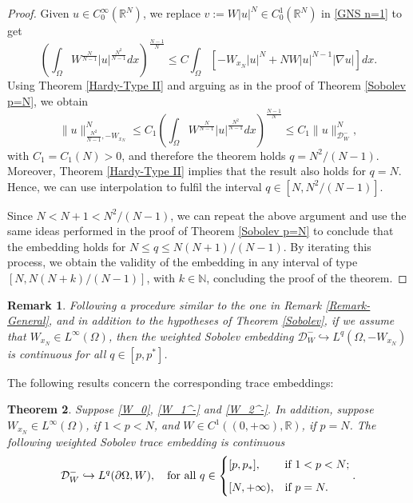 \documentclass[12pt]{amsart}
\newtheorem{theorem}{Theorem}[section]
\newtheorem{remark}[theorem]{Remark}
\theoremstyle{definition}
\theoremstyle{plain}
\newcommand{\dint}{\int_{\Omega}}
\begin{document}
\begin{proof}
    Given $u \in C^{\infty}_0(\mathbb{R}^N)$, we replace   $v:=W|u|^N \in C_0^1(\mathbb{R}^N)$ in \eqref{GNS n=1} to get 
      $$
			\left(\dint W^{\frac{N}{N-1}}|u|^{\frac{N^2}{N-1}}dx\right)^{\frac{N-1}{N}}\leq C  \dint \left[-W_{{x_N}}|u|^N+NW|u|^{N-1}|\nabla u|\right]dx.
		$$
        Using Theorem \ref{Hardy-Type II} and arguing as in the proof of Theorem \ref{Sobolev p=N}, we obtain 
		$$
			\|u\|_{\frac{N^2}{N-1},-W_{x_N}}^N \leq C_1\left(\dint  W^{\frac{N}{N-1}}|u|^{\frac{N^2}{N-1}}dx\right)^{\frac{N-1}{N}}\leq C_1\|u\|_{\mathcal{D}_W^-}^N,
		$$
		with $C_1 = C_1(N)>0$, and therefore the theorem holds $q=N^2/(N-1)$.  Moreover,   Theorem \ref{Hardy-Type II} implies that the result also holds for $q=N$. Hence, we can use interpolation to fulfil the interval  $q \in [N,N^2/(N-1)]$.

        Since $N<N+1<N^2/(N-1)$, we can repeat the above argument and use the same ideas performed in the proof of Theorem \ref{Sobolev p=N} to conclude that the embedding holds for $N \leq q \leq N(N+1)/(N-1)$. 
		By iterating this process, we obtain the validity of the embedding in any interval of type $\left[N,N(N+k)/(N-1)\right]$,  with $k \in \mathbb{N}$, concluding the proof of the theorem.
\end{proof}

\begin{remark}  
    Following a procedure similar to the one in Remark \ref{Remark-General}, and in addition to the hypotheses of Theorem \ref{Sobolev}, if we assume that $W_{x_N} \in L^\infty({\Omega})$, then the weighted Sobolev embedding $\mathcal{D}_W^- \hookrightarrow L^q(\Omega,-W_{x_N})$ is continuous for all $q \in [p, p^*]$.
\end{remark}

The following results concern the corresponding trace embeddings:

\begin{theorem}\label{trace-negative}
		Suppose \eqref{W_0}, \eqref{W_1^-} and  \eqref{W_2^-}. In addition, suppose $W_{x_N} \in L^{\infty}(\Omega)$, if $1<p<N$, and $W \in C^1((0,+\infty),\mathbb{R})$, if $p=N$.        The following weighted 
        Sobolev trace embedding is continuous        
$$       \mathcal{D}_W^- \hookrightarrow L^q(\partial\Omega, W) , \quad \text{for all } q \in \begin{cases} [p,p_*], & \text{if } 1<p<N; \medskip \\ 
[N,+\infty), & \text{if } p=N.\end{cases}.
$$
 \end{theorem} 
\end{document}
